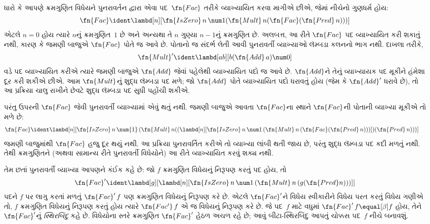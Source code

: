 \documentclass[../../../include/open-logic-section]{subfiles}
\begin{document}


ધારો કે આપણે ક્રમગુણિત વિધેયને પુનરાવર્તન દ્વારા એવા
પદ~$\fn{Fac}$ તરીકે વ્યાખ્યાયિત કરવા માગીએ છીએ, જેમાં નીચેનો ગુણધર્મ હોય:
\[
\fn{Fac} \ident \lambd[n][\fn{IsZero}\, n\, \num 1 (\fn{Mult}\, n (\fn{Fac}(\fn{Pred} \, n)))]
\]
એટલે $n=0$ હોય ત્યારે $n$નું ક્રમગુણિત~$1$ છે અને
અન્યથા તે $n$ ગુણ્યા $n-1$નું ક્રમગુણિત છે. અલબત્ત, આ રીતે
$\fn{Fac}$ પદ વ્યાખ્યાયિત કરી શકાતું નથી, કારણ કે જમણી બાજુએ
$\fn{Fac}$ પોતે જ આવે છે. પોતાનો જ સંદર્ભ લેતી આવી
પુનરાવર્તી વ્યાખ્યાઓ લૅમ્બડા કલનનો ભાગ નથી. દાખલા તરીકે,
\[
\fn{Mult}' \ident \lambd[ab][b (\fn{Add}\, a) \num0]
\]
વડે પદ વ્યાખ્યાયિત કરીએ ત્યારે જમણી બાજુએ $\fn{Add}$ જેવાં
પહેલેથી વ્યાખ્યાયિત પદો જ આવે છે. $\fn{Add}$ને તેનું વ્યાખ્યાયક
પદ મૂકીને હંમેશા દૂર કરી શકીએ છીએ. આમ $\fn{Mult}$નું
શુદ્ધ લૅમ્બડા પદ મળે; જો $\fn{Add}$ પોતે વ્યાખ્યાયિત પદો
ધરાવતું હોય (જેમ કે $\fn{Add}'$ ધરાવે છે), તો આ પ્રક્રિયા
ચાલુ રાખીને છેવટે શુદ્ધ લૅમ્બડા પદ સુધી પહોંચી શકીએ.

પરંતુ ઉપરની $\fn{Fac}$ જેવી પુનરાવર્તી વ્યાખ્યામાં એવું થતું
નથી. જમણી બાજુએ આવતા $\fn{Fac}$ના સ્થાને
$\fn{Fac}$ની પોતાની વ્યાખ્યા મૂકીએ તો મળે છે:
\begin{align*}
  \fn{Fac} & \ident \lambd[n][\fn{IsZero}\, n\, \num{1}\,
    (\fn{Mult}\, n
  ((\lambd[n][\fn{IsZero} \, n \, \num 1\, (\fn{Mult}\, n\, (\fn{Fac}
    (\fn{Pred}\, n)))]) (\fn{Pred}\, n)))]
\end{align*}
જમણી બાજુમાંથી $\fn{Fac}$ હજુ દૂર થયું નથી. આ પ્રક્રિયા
પુનરાવર્તિત કરીએ તો વ્યાખ્યા લાંબી થતી જાય છે, પરંતુ
શુદ્ધ લૅમ્બડા પદ કદી મળતું નથી. તેથી ક્રમગુણિતને
(અથવા સામાન્ય રીતે પુનરાવર્તી વિધેયોને) આ રીતે વ્યાખ્યાયિત
કરવું શક્ય નથી.

તેમ છતાં પુનરાવર્તી વ્યાખ્યા આપણને કંઈક કહે છે: જો
$f$ ક્રમગુણિત વિધેયનું નિરૂપણ કરતું પદ હોય, તો
\[
\fn{Fac}' \ident \lambd[g][\lambd[n][\fn{IsZero} \, n \, \num 1\, (\fn{Mult} \, n\, (g (\fn{Pred} n)))]]
\]
પદને $f$ પર લાગુ કરતાં મળતું $\fn{Fac}'\,f$ પણ ક્રમગુણિત
વિધેયનું નિરૂપણ કરે છે. એટલે $\fn{Fac}'$ને વિધેય સ્વીકારીને
વિધેય પરત કરતું વિધેય ગણીએ તો, $f$ ક્રમગુણિત વિધેયનું
નિરૂપણ કરતું હોય ત્યારે $\fn{Fac'}\, f$ એ જ વિધેયનું
નિરૂપણ કરે છે. જે પદ~$f$ માટે વધુમાં $\fn{Fac}' \, f
\equal[\beta] f$ હોય, તેને $\fn{Fac}'$નું
\emph{સ્થિરબિંદુ} કહે છે. વિધેયોના સ્તરે ક્રમગુણિત
$\fn{Fac}'$ હેઠળ અચળ રહે છે; આવું બીટા-સ્થિરબિંદુ
આપતું ચોક્કસ પદ~$f$ નીચે બનાવશું.
\end{document}
